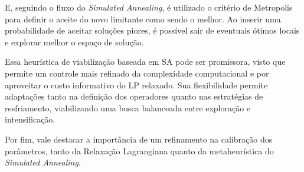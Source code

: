 E, seguindo o fluxo do \emph{Simulated Annealing}, é utilizado o critério de Metropolis \cite{Gendreau2010} para definir o aceite do novo limitante como sendo o melhor. Ao inserir uma probabilidade de aceitar soluções piores, é possível sair de eventuais ótimos locais e explorar melhor o espaço de solução.

Essa heurística de viabilização baseada em SA pode ser promissora, visto que permite um controle mais refinado da complexidade computacional e por aproveitar o custo informativo do LP relaxado. Sua flexibilidade permite adaptações tanto na definição dos operadores quanto nas estratégias de resfriamento, viabilizando uma busca balanceada entre exploração e intensificação\cite{Gendreau2010}.

Por fim, vale destacar a importância de um refinamento na calibração dos parâmetros, tanto da Relaxação Lagrangiana quanto da metaheurística do \emph{Simulated Annealing}.
